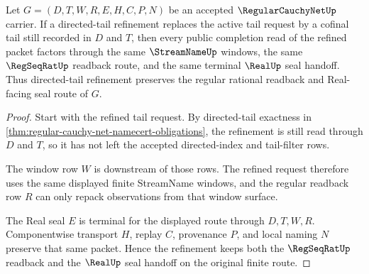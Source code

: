 \begin{theorem}
\label{thm:regular-cauchy-net-tail-stability}
Let $G=(D,T,W,R,E,H,C,P,N)$ be an accepted $\RegularCauchyNetUp$ carrier. If a directed-tail refinement replaces the active tail request by a cofinal tail still recorded in $D$ and $T$, then every public completion read of the refined packet factors through the same $\StreamNameUp$ windows, the same $\RegSeqRatUp$ readback route, and the same terminal $\RealUp$ seal handoff. Thus directed-tail refinement preserves the regular rational readback and Real-facing seal route of $G$.
\end{theorem}
\begin{proof}
Start with the refined tail request. By directed-tail exactness in \autoref{thm:regular-cauchy-net-namecert-obligations}, the refinement is still read through $D$ and $T$, so it has not left the accepted directed-index and tail-filter rows.

The window row $W$ is downstream of those rows. The refined request therefore uses the same displayed finite StreamName windows, and the regular readback row $R$ can only repack observations from that window surface.

The Real seal $E$ is terminal for the displayed route through $D,T,W,R$. Componentwise transport $H$, replay $C$, provenance $P$, and local naming $N$ preserve that same packet. Hence the refinement keeps both the $\RegSeqRatUp$ readback and the $\RealUp$ seal handoff on the original finite route.
\end{proof}




